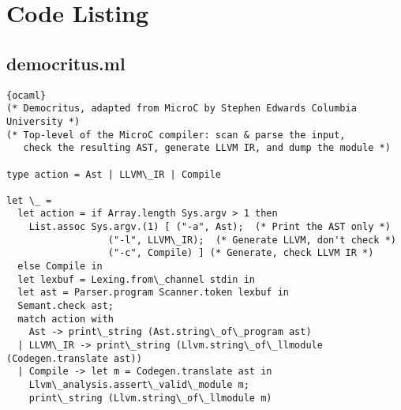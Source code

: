 \chapter{Code Listing}
\section{democritus.ml}
\begin{lstlisting}{ocaml}
(* Democritus, adapted from MicroC by Stephen Edwards Columbia University *)
(* Top-level of the MicroC compiler: scan & parse the input,
   check the resulting AST, generate LLVM IR, and dump the module *)

type action = Ast | LLVM\_IR | Compile

let \_ =
  let action = if Array.length Sys.argv > 1 then
    List.assoc Sys.argv.(1) [ ("-a", Ast);	(* Print the AST only *)
			      ("-l", LLVM\_IR);  (* Generate LLVM, don't check *)
			      ("-c", Compile) ] (* Generate, check LLVM IR *)
  else Compile in
  let lexbuf = Lexing.from\_channel stdin in
  let ast = Parser.program Scanner.token lexbuf in
  Semant.check ast;
  match action with
    Ast -> print\_string (Ast.string\_of\_program ast)
  | LLVM\_IR -> print\_string (Llvm.string\_of\_llmodule (Codegen.translate ast))
  | Compile -> let m = Codegen.translate ast in
    Llvm\_analysis.assert\_valid\_module m;
    print\_string (Llvm.string\_of\_llmodule m)
\end{lstlisting}
